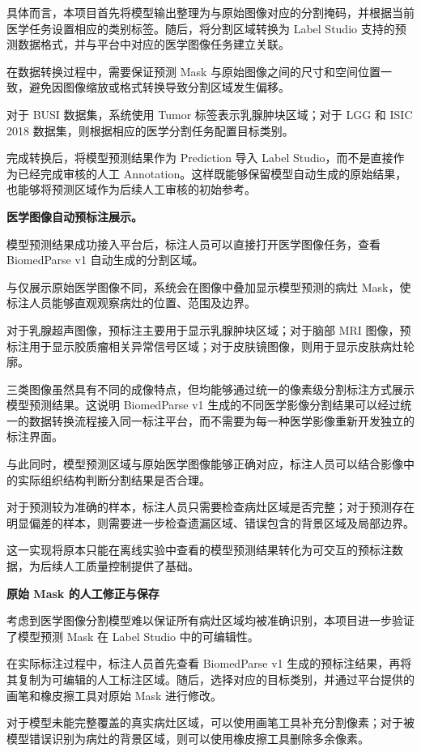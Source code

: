 \documentclass[10.5pt,compsoc]{CjC}
\theoremstyle{mystyle}
\begin{document}
具体而言，本项目首先将模型输出整理为与原始图像对应的分割掩码，并根据当前医学任务设置相应的类别标签。随后，将分割区域转换为 Label Studio 支持的预测数据格式，并与平台中对应的医学图像任务建立关联。

在数据转换过程中，需要保证预测 Mask 与原始图像之间的尺寸和空间位置一致，避免因图像缩放或格式转换导致分割区域发生偏移。

对于 BUSI 数据集，系统使用 Tumor 标签表示乳腺肿块区域；对于 LGG 和 ISIC 2018 数据集，则根据相应的医学分割任务配置目标类别。

完成转换后，将模型预测结果作为 Prediction 导入 Label Studio，而不是直接作为已经完成审核的人工 Annotation。这样既能够保留模型自动生成的原始结果，也能够将预测区域作为后续人工审核的初始参考。


\noindent\textbf{医学图像自动预标注展示。}

模型预测结果成功接入平台后，标注人员可以直接打开医学图像任务，查看 BiomedParse v1 自动生成的分割区域。

与仅展示原始医学图像不同，系统会在图像中叠加显示模型预测的病灶 Mask，使标注人员能够直观观察病灶的位置、范围及边界。

对于乳腺超声图像，预标注主要用于显示乳腺肿块区域；对于脑部 MRI 图像，预标注用于显示胶质瘤相关异常信号区域；对于皮肤镜图像，则用于显示皮肤病灶轮廓。

三类图像虽然具有不同的成像特点，但均能够通过统一的像素级分割标注方式展示模型预测结果。这说明 BiomedParse v1 生成的不同医学影像分割结果可以经过统一的数据转换流程接入同一标注平台，而不需要为每一种医学影像重新开发独立的标注界面。

与此同时，模型预测区域与原始医学图像能够正确对应，标注人员可以结合影像中的实际组织结构判断分割结果是否合理。

对于预测较为准确的样本，标注人员只需要检查病灶区域是否完整；对于预测存在明显偏差的样本，则需要进一步检查遗漏区域、错误包含的背景区域及局部边界。

这一实现将原本只能在离线实验中查看的模型预测结果转化为可交互的预标注数据，为后续人工质量控制提供了基础。

\noindent\textbf{原始 Mask 的人工修正与保存}

考虑到医学图像分割模型难以保证所有病灶区域均被准确识别，本项目进一步验证了模型预测 Mask 在 Label Studio 中的可编辑性。

在实际标注过程中，标注人员首先查看 BiomedParse v1 生成的预标注结果，再将其复制为可编辑的人工标注区域。随后，选择对应的目标类别，并通过平台提供的画笔和橡皮擦工具对原始 Mask 进行修改。

对于模型未能完整覆盖的真实病灶区域，可以使用画笔工具补充分割像素；对于被模型错误识别为病灶的背景区域，则可以使用橡皮擦工具删除多余像素。
\end{document}
